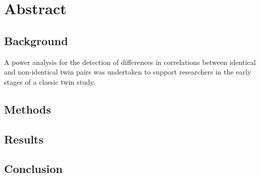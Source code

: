 \section*{Abstract}


\subsection*{Background}
A power analysis for the detection of differences in correlations between identical and non-identical twin pairs was undertaken to support researchers in the early stages of a classic twin study.

\subsection*{Methods}

\subsection*{Results}

\subsection*{Conclusion}  

